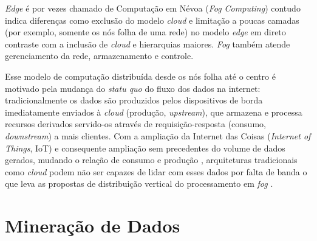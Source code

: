 \emph{Edge} é por vezes chamado de Computação em Névoa (\emph{Fog Computing})
contudo  indica diferenças como exclusão do
modelo \emph{cloud} e limitação a poucas camadas (por exemplo, somente os nós folha de uma rede)
no modelo \emph{edge} em direto contraste com a inclusão de \emph{cloud} e hierarquias
maiores. \emph{Fog} também atende gerenciamento da rede, armazenamento e controle.


Esse modelo de computação distribuída desde os nós folha até o centro é motivado
pela mudança do \emph{statu quo} do fluxo dos dados na internet: tradicionalmente
os dados são produzidos pelos dispositivos de borda imediatamente enviados à 
\emph{cloud} (produção, \emph{upstream}),
que armazena e processa recursos derivados servido-os através de requisição-resposta
(consumo, \emph{downstream}) a mais clientes.
Com a ampliação da Internet das Coisas (\emph{Internet of Things}, IoT) e consequente
ampliação sem precedentes do volume de dados gerados, mudando o relação de consumo
e produção \cite{Shi2016}, arquiteturas tradicionais como \emph{cloud} podem não
ser capazes de lidar com esses dados por falta de banda o que leva as
propostas de distribuição vertical do processamento em \emph{fog} \cite{Bonomi2012, Dastjerdi2016}.



\section{Mineração de Dados}
